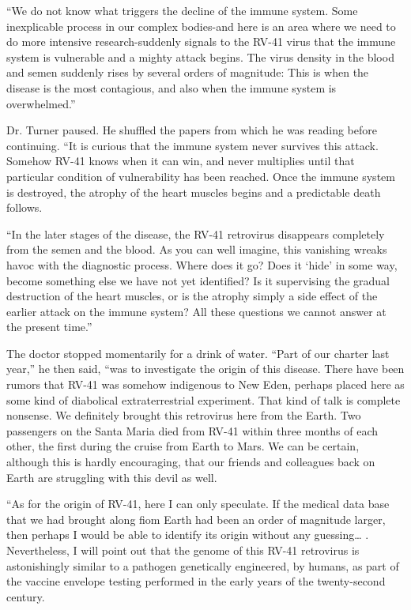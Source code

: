 \documentclass[]{article}
\begin{document}
{“We do not know what triggers the decline of the immune system.  Some inexplicable process in our complex bodies-and here is an area where we need to do more intensive research-suddenly signals to the RV-41 virus that the immune system is vulnerable and a mighty attack begins.  The virus density in the blood and semen suddenly rises by several orders of magnitude: This is when the disease is the most contagious, and also when the immune system is overwhelmed.”

Dr.  Turner paused.  He shuffled the papers from which he was reading before continuing.  “It is curious that the immune system never survives this attack.  Somehow RV-41 knows when it can win, and never multiplies until that particular condition of vulnerability has been reached.  Once the immune system is destroyed, the atrophy of the heart muscles begins and a predictable death follows.

“In the later stages of the disease, the RV-41 retrovirus disappears completely from the semen and the blood.  As you can well imagine, this vanishing wreaks havoc with the diagnostic process.  Where does it go? Does it ‘hide’ in some way, become something else we have not yet identified? Is it supervising the gradual destruction of the heart muscles, or is the atrophy simply a side effect of the earlier attack on the immune system? All these questions we cannot answer at the present time.”

The doctor stopped momentarily for a drink of water.  “Part of our charter last year,” he then said, “was to investigate the origin of this disease.  There have been rumors that RV-41 was somehow indigenous to New Eden, perhaps placed here as some kind of diabolical extraterrestrial experiment.  That kind of talk is complete nonsense.  We definitely brought this retrovirus here from the Earth.  Two passengers on the Santa Maria died from RV-41 within three months of each other, the first during the cruise from Earth to Mars.  We can be certain, although this is hardly encouraging, that our friends and colleagues back on Earth are struggling with this devil as well.

“As for the origin of RV-41, here I can only speculate.  If the medical data base that we had brought along fiom Earth had been an order of magnitude larger, then perhaps I would be able to identify its origin without any guessing… .  Nevertheless, I will point out that the genome of this RV-41 retrovirus is astonishingly similar to a pathogen genetically engineered, by humans, as part of the vaccine envelope testing performed in the early years of the twenty-second century.

}
\end{document}
